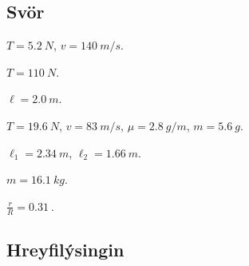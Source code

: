 \begin{enumerate}[label = \textbf{Dæmi \thechapter.\arabic*.}]

\end{enumerate}

\subsection*{Svör}

\begin{enumerate*}[label = \vspace{0.15cm} \textbf{(\arabic*)}]
  \item $T = \SI{5.2}{N}$, $v = \SI{140}{m/s}$.
  \item $T = \SI{110}{N}$.
  \item $\ell = \SI{2.0}{m}$.
  \item $T = \SI{19.6}{N}$, $v = \SI{83}{m/s}$, $\mu = \SI{2.8}{g/m}$, $m = \SI{5.6}{g}$.
  \item $\ell_1 = \SI{2.34}{m}$, $\ell_2 = \SI{1.66}{m}$.
  \item $m = \SI{16.1}{kg}$.
  \item $\frac{r}{R} = \SI{0.31}{}$.
\end{enumerate*}


\newpage 

\subsection*{Hreyfilýsingin}

